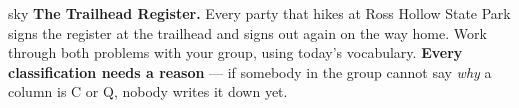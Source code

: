 \documentclass[10pt]{article}
\begin{document}

\vspace{0.07in}

\boxguard[10]
\begin{headlinebox}{sky}
\small
\textbf{The Trailhead Register.} Every party that hikes at Ross Hollow State Park signs the
register at the trailhead and signs out again on the way home. Work through both problems with
your group, using today's vocabulary. \textbf{Every classification needs a reason} --- if
somebody in the group cannot say \emph{why} a column is C or Q, nobody writes it down yet.
\end{headlinebox}

\vspace{0.07in}
\end{document}
